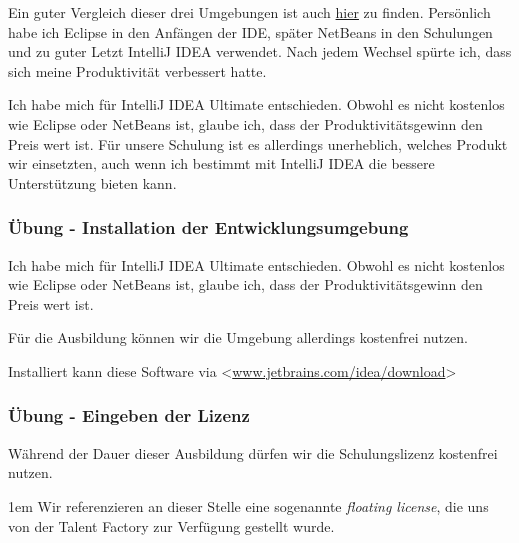 Ein guter Vergleich dieser drei Umgebungen ist auch
\href{https://www.javaworld.com/article/3114167/development-tools/choosing-your-java-ide.html}
{hier} zu finden. Persönlich habe ich Eclipse in den Anfängen der IDE, später
NetBeans in den Schulungen und zu guter Letzt IntelliJ IDEA verwendet. Nach
jedem Wechsel spürte ich, dass sich meine Produktivität verbessert hatte.

Ich habe mich für IntelliJ IDEA Ultimate entschieden. Obwohl es nicht kostenlos
wie Eclipse oder NetBeans ist, glaube ich, dass der Produktivitätsgewinn den
Preis wert ist. Für unsere Schulung ist es allerdings unerheblich, welches
Produkt wir einsetzten, auch wenn ich bestimmt mit IntelliJ IDEA die bessere
Unterstützung bieten kann.


\begin{frame}[fragile]
    \frametitle<presentation>{Übung - Installation der Entwicklungsumgebung}

    Ich habe mich für IntelliJ IDEA Ultimate entschieden. Obwohl es nicht kostenlos
    wie Eclipse oder NetBeans ist, glaube ich, dass der Produktivitätsgewinn den
    Preis wert ist.

    Für die Ausbildung können wir die Umgebung allerdings kostenfrei nutzen.

    Installiert kann diese Software via <\href{https://www.jetbrains.com/idea/download}
    {www.jetbrains.com/idea/download}>

\end{frame}

\begin{frame}[fragile]
    \frametitle<presentation>{Übung - Eingeben der Lizenz}

    \begin{minipage}[b]{0.5\textwidth}
    \end{minipage}
    \begin{minipage}[b]{0.4\textwidth}
        Während der Dauer dieser Ausbildung dürfen wir die Schulungslizenz
        kostenfrei nutzen.

        \parskip1em
        Wir referenzieren an dieser Stelle eine sogenannte {\em floating license},
        die uns von der Talent Factory zur Verfügung gestellt wurde.
    \end{minipage}

\end{frame}


